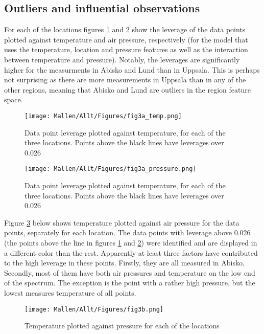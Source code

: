 \subsection{Outliers and influential observations}
For each of the locations figures \ref{fig3a_temp} and \ref{fig3a_pressure} show the leverage of the data points plotted against temperature and air pressure, respectively (for the model that uses the temperature, location and pressure features as well as the interaction between temperature and pressure). Notably, the leverages are significantly higher for the measurments in Abisko and Lund than in Uppsala. This is perhaps not surprising as there are more measurements in Uppsala than in any of the other regions, meaning that Abisko and Lund are outliers in the region feature space. 

\begin{figure}[H]
\centering
	\texttt{[image: Mallen/Allt/Figures/fig3a\_temp.png]}    		\caption{Data point leverage plotted against temperature, for each of the three locations. Points above the black lines have leverages over 0.026  }
    \label{fig3a_temp}
\end{figure}


\begin{figure}[H]
\centering
	\texttt{[image: Mallen/Allt/Figures/fig3a\_pressure.png]}    		\caption{Data point leverage plotted against temperature, for each of the three locations. Points above the black lines have leverages over 0.026 }
    \label{fig3a_pressure}
\end{figure}
Figure \ref{fig3b} below shows temperature plotted against air pressure for the data points, separately for each location. The data points with leverage above 0.026 (the points above the line in figures \ref{fig3a_temp} and \ref{fig3a_pressure}) were identified and are displayed in a different color than the rest. Apparently at least three factors have contributed to the high leverage in these points. Firstly, they are all measured in Abisko. Secondly, most of them have both air pressures and temperature on the low end of the spectrum. The exception is the point with a rather high pressure, but the lowest measures temperature of all points. 
\begin{figure}[H]
\centering
	\texttt{[image: Mallen/Allt/Figures/fig3b.png]}    		\caption{Temperature plotted against pressure for each of the locations}
    \label{fig3b}
\end{figure}


